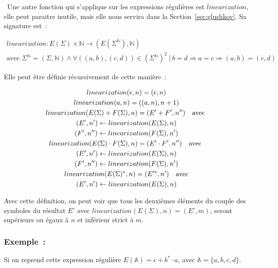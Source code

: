 \documentclass[12pt]{article}
\begin{document}
\textbullet~Une autre fonction qui s'applique sur les expressions régulières
est \(linearization\), elle peut paraitre inutile, mais elle nous servira dans
la Section~\ref{sec:glushkov}. Sa signature est~:

\begin{gather*}
    linearization: E(\Sigma) \times \mathbb{N} \to (E(\Sigma^{\mathbb{N}}), \mathbb{N}) \\
    \text{avec } \Sigma^{\mathbb{N}} = (\Sigma, \mathbb{N}) \land \forall ((a, b), (c, d)) \in (\Sigma^{\mathbb{N}})^2 ~|~ b = d \Rightarrow a = c \Rightarrow (a, b) = (c, d)
\end{gather*}

Elle peut être définie récursivement de cette manière~:

\begin{gather}
    linearization(\epsilon, n) = (\epsilon, n) \\
    linearization(a, n) = ((a, n), n + 1) \\
    linearization(E(\Sigma) + F(\Sigma), n) = (E' + F', n'') \quad \text{avec } \\
    (E', n') \leftarrow linearization(E(\Sigma), n) \notag \\
    (F', n'') \leftarrow linearization(F(\Sigma), n') \notag \\
    linearization(E(\Sigma) \cdot F(\Sigma), n) = (E' \cdot F', n'') \quad
    \text{avec } \\
    (E', n') \leftarrow linearization(E(\Sigma), n) \notag \\
    (F', n'') \leftarrow linearization(F(\Sigma), n') \notag \\
    linearization(E(\Sigma)^*, n) = (E'^*, n') \quad \text{avec} \\
    (E', n') \leftarrow linearization(E(\Sigma), n) \notag
\end{gather}

Avec cette définition, on peut voir que tous les deuxièmes éléments du couple
des symboles du résultat \(E'\) avec \(linearization(E(\Sigma), n) = (E', m)\),
seront supérieurs ou égaux à \(n\) et inférieur strict à \(m\).

\subsubsection*{Exemple~:}

Si on reprend cette expression régulière \(E(\mathbb{A}) = \epsilon + b^* \cdot
a\), avec \(\mathbb{A} = \{a, b, c, d\}\).
\end{document}
